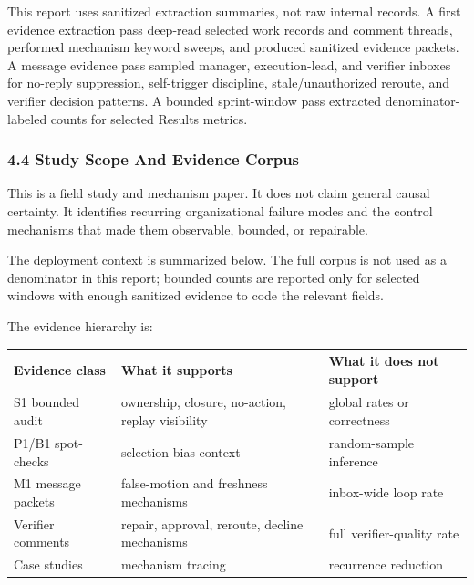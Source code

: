 \documentclass[
]{article}
\newcounter{none} %
\begin{document}
This report uses sanitized extraction summaries, not raw internal records. A first evidence extraction pass deep-read selected work records and comment threads, performed mechanism keyword sweeps, and produced sanitized evidence packets. A message evidence pass sampled manager, execution-lead, and verifier inboxes for no-reply suppression, self-trigger discipline, stale/unauthorized reroute, and verifier decision patterns. A bounded sprint-window pass extracted denominator-labeled counts for selected Results metrics.

\subsubsection{4.4 Study Scope And Evidence Corpus}\label{study-scope-and-evidence-corpus}

This is a field study and mechanism paper. It does not claim general causal certainty. It identifies recurring organizational failure modes and the control mechanisms that made them observable, bounded, or repairable.

The deployment context is summarized below. The full corpus is not used as a denominator in this report; bounded counts are reported only for selected windows with enough sanitized evidence to code the relevant fields.

The evidence hierarchy is:

{\def\LTcaptype{none} %
\begin{longtable}[]{@{}
  >{\raggedright\arraybackslash}p{}
  >{\raggedright\arraybackslash}p{}
  >{\raggedright\arraybackslash}p{}@{}}
\toprule\noalign{}
\begin{minipage}[b]{\linewidth}\raggedright
Evidence class
\end{minipage} & \begin{minipage}[b]{\linewidth}\raggedright
What it supports
\end{minipage} & \begin{minipage}[b]{\linewidth}\raggedright
What it does not support
\end{minipage} \\
\midrule\noalign{}
\endhead
\bottomrule\noalign{}
\endlastfoot
S1 bounded audit & ownership, closure, no-action, replay visibility & global rates or correctness \\
P1/B1 spot-checks & selection-bias context & random-sample inference \\
M1 message packets & false-motion and freshness mechanisms & inbox-wide loop rate \\
Verifier comments & repair, approval, reroute, decline mechanisms & full verifier-quality rate \\
Case studies & mechanism tracing & recurrence reduction \\
\end{longtable}
}
\end{document}

